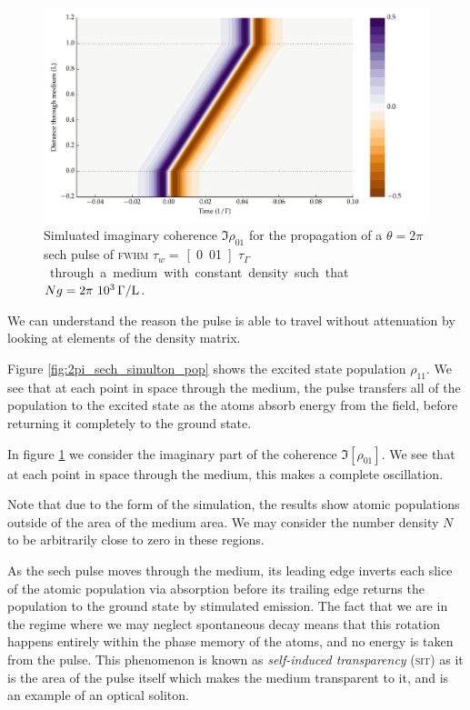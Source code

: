     \begin{figure}[]
      \includegraphics[width=\linewidth]
        {figs/03_nonlinear/coh_sech_2_0pi_fwhm0_010_Ng01000_fig3.pdf}
      \caption{
        Simluated imaginary coherence $\Im{\rho_{01}}$ for the propagation of a
        $\theta = 2\pi$ sech pulse of \textsc{fwhm} $\tau_w = $
        \unit[0.01]{$\tau_\Gamma$} through a medium with constant
        density such that $Ng = \unit[2\pi~10^3]{\Gamma/L}$.
      }
      \label{fig:2pi_sech_simulton_coh}
    \end{figure}

    We can understand the reason the pulse is able to travel without attenuation
    by looking at elements of the density matrix. 

    Figure \ref{fig:2pi_sech_simulton_pop} shows the excited state population
    $\rho_{11}$. We see that at each point in space through the medium, the
    pulse transfers all of the population to the excited state as the atoms
    absorb energy from the field, before returning it completely to the ground
    state.

    In figure \ref{fig:2pi_sech_simulton_coh} we consider the imaginary part of
    the coherence $\Im\left[{\rho_{01}}\right]$. We see that at each point in space through
    the medium, this makes a complete oscillation.

    Note that due to the form of the simulation, the results show atomic
    populations outside of the area of the medium area. We may consider the
    number density $N$ to be arbitrarily close to zero in these regions.

    As the sech pulse moves through the medium, its leading edge inverts each
    slice of the atomic population via absorption before its trailing edge
    returns the population to the ground state by stimulated
    emission.\cite{Lamb1971} The fact that we are in the regime where we may
    neglect spontaneous decay means that this rotation happens entirely within
    the phase memory of the atoms, and no energy is taken from the pulse. This
    phenomenon is known as \textit{self-induced transparency} (\textsc{sit}) as
    it is the area of the pulse itself which makes the medium transparent to it,
    and is an example of an optical soliton\cite{kivshar2003optical}.

